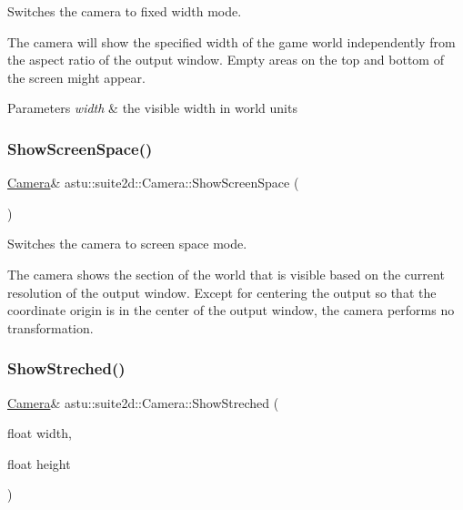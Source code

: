 Switches the camera to fixed width mode.

The camera will show the specified width of the game world independently from the aspect ratio of the output window. Empty areas on the top and bottom of the screen might appear.


\begin{DoxyParams}{Parameters}
{\em width} & the visible width in world units \\
\hline
\end{DoxyParams}
\mbox{\label{classastu_1_1suite2d_1_1Camera_a9bfad2b33a3dc2f1c3581ae9e9bb177f}} 
\subsubsection{\texorpdfstring{Show\+Screen\+Space()}{ShowScreenSpace()}}
{\footnotesize\ttfamily \hyperlink{classastu_1_1suite2d_1_1Camera}{Camera}\& astu\+::suite2d\+::\+Camera\+::\+Show\+Screen\+Space (\begin{DoxyParamCaption}{ }\end{DoxyParamCaption})}

Switches the camera to screen space mode.

The camera shows the section of the world that is visible based on the current resolution of the output window. Except for centering the output so that the coordinate origin is in the center of the output window, the camera performs no transformation. \mbox{\label{classastu_1_1suite2d_1_1Camera_ad20b708f44ce1ef1ff68214370c823d3}} 
\subsubsection{\texorpdfstring{Show\+Streched()}{ShowStreched()}\hspace{0.1cm}{\footnotesize\ttfamily [1/2]}}
{\footnotesize\ttfamily \hyperlink{classastu_1_1suite2d_1_1Camera}{Camera}\& astu\+::suite2d\+::\+Camera\+::\+Show\+Streched (\begin{DoxyParamCaption}\item[{float}]{width,  }\item[{float}]{height }\end{DoxyParamCaption})}

